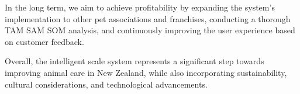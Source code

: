 In the long term, we aim to achieve profitability by expanding the system's implementation to other pet associations and franchises, conducting a thorough TAM SAM SOM analysis, and continuously improving the user experience based on customer feedback.

Overall, the intelligent scale system represents a significant step towards improving animal care in New Zealand, while also incorporating sustainability, cultural considerations, and technological advancements.

